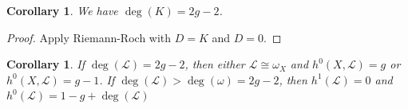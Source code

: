 \documentclass[10pt]{article}
\newtheorem{prop}[thm]{Proposition}
\newtheorem{cor}[thm]{Corollary}
\theoremstyle{definition}
\newcommand{\mf}{\mathfrak}
\newcommand{\C}{\mathbb{C}}
\newcommand{\OO}{\mathcal{O}}
\newcommand{\LL}{\mathcal{L}}
\newcommand{\h}{\mf{h}}
\begin{document}
\begin{cor}
We have $\deg(K) = 2g - 2$.
\end{cor}
\begin{proof}
Apply Riemann-Roch with $D = K$ and $D = 0$.
\end{proof}
%
%
\begin{cor}
If $\deg(\LL) = 2g-2$, then either $\mathcal{L} \cong \omega_X$ and $h^0(X, \LL) = g$ or $h^0(X, \LL) = g-1$.  If $\deg(\LL) > \deg(\omega) = 2g - 2$, then $h^1(\mathcal{L}) = 0$ and $h^0(\mathcal{L}) = 1 - g + \deg(\LL)$
\end{cor}
%
%
%
\end{document}
